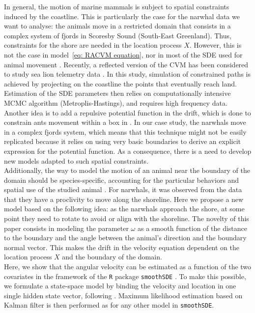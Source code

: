 \documentclass[11pt]{article}
\newcommand {\1}{\mathbb{1}}
\begin{document}
In general, the motion of marine mammals is subject to spatial constraints induced by the coastline. This is particularly the case for the narwhal data we want to analyse: the animals move in a restricted domain that consists in a complex system of fjords in Scoresby Sound (South-East Greenland). Thus, constraints for the shore are needed in the location process $X$. However, this is not the case in model~\ref{eq: RACVM equation}, nor in most of the SDE used for animal movement \cite{johnson_continuoustime_2008,michelot_varying-coefficient_2021,gurarie_correlated_2017}. 
Recently, a reflected version of the CVM has been considered to study sea lion telemetry data \cite{hanks_reflected_2017}.
In this study, simulation of constrained paths is achieved by projecting on the coastline the  points that eventually reach land. Estimation of the SDE parameters then relies on computationally intensive MCMC algorithm (Metroplis-Hastings), and requires high frequency data. Another idea is to add a repulsive potential function in the drift, which is done to constrain ants movement within a box in \cite{russell_spatially_2018}. In our case study, the narwhals move in a complex fjords system, which means that this technique might not be easily replicated because it relies on using very basic boundaries to derive an explicit expression for the potential function. As a consequence, there is a need to develop new models adapted to such spatial constraints.\\
Additionally, the way to model the motion of an animal near the boundary of the domain should be species-specific, accounting for the particular behaviors and spatial use of the studied animal \cite{brillinger_simulating_2003}. For narwhals, it was observed from the data that they have a proclivity to move along the shoreline. Here we propose a new model based on the following idea: as the narwhals approach the shore, at some point they need to rotate to avoid or align with the shoreline. The novelty of this paper consists in modeling the parameter $\omega$ as a smooth function of the distance to the boundary and the angle between the animal's direction and the boundary normal vector. This makes the drift in the velocity equation dependent on the location process $X$ and the boundary of the domain.  \\ %



Here, we show that the angular velocity  can be estimated as a function of the two covariates in the framework of the \texttt{R} package \texttt{smoothSDE} \cite{michelot_varying-coefficient_2021}. To make this possible, we formulate a state-space model by binding the velocity and location in one single hidden state vector, following \cite{johnson_continuoustime_2008}. Maximum likelihood estimation based on Kalman filter is then performed as for any other model in \texttt{smoothSDE}.\\
\end{document}

